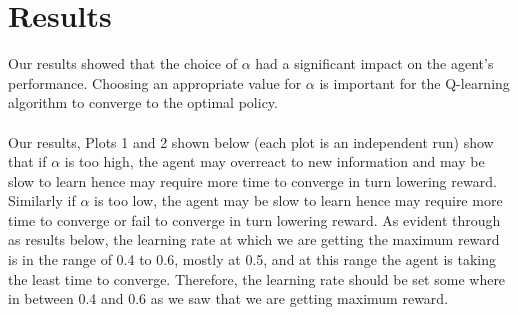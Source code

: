 \documentclass[conference]{IEEEtran}
\begin{document}
\section{Results}
Our results showed that the choice of $\alpha$ had a significant impact on the agent's performance. Choosing an appropriate value for $\alpha$ is important for the Q-learning algorithm to converge to the optimal policy. \\ \\ Our results, Plots 1 and 2 shown below (each plot is an independent run) show that if $\alpha$ is too high, the agent may overreact to new information and may be slow to learn hence may require more time to converge in turn lowering reward. Similarly if $\alpha$ is too low, the agent may be slow to learn hence may require more time to converge or fail to converge in turn lowering reward. As evident through as results below, the learning rate at which we are getting the maximum reward is in the range of 0.4 to 0.6, mostly at 0.5, and at this range the agent is taking the least time to converge. Therefore, the learning rate should be set some where in between 0.4 and 0.6 as we saw that we are getting maximum reward. 



\end{document}
